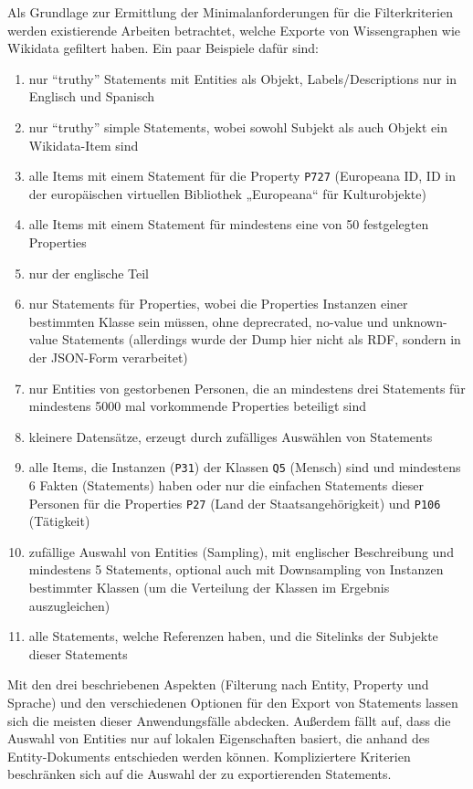 Als Grundlage zur Ermittlung der Minimalanforderungen für die Filterkriterien werden existierende Arbeiten betrachtet, welche Exporte von Wissengraphen wie Wikidata gefiltert haben.
Ein paar Beispiele dafür sind:
\begin{enumerate}[label=\arabic*)]
  \item nur "`truthy"' Statements mit Entities als Objekt, Labels/Descriptions nur in Englisch und Spanisch\cite{usage-grafa}
  \item nur "`truthy"' simple Statements, wobei sowohl Subjekt als auch Objekt ein Wikidata-Item sind\cite{usage-wembedder}
  \item alle Items mit einem Statement für die Property \verb|P727| (Europeana ID, ID in der europäischen virtuellen Bibliothek „Europeana“ für Kulturobjekte)\cite{usage-europeana}
  \item alle Items mit einem Statement für mindestens eine von 50 festgelegten Properties\cite{usage-narratives} 
  \item nur der englische Teil\cite{usage-web-tables} 
  \item nur Statements für Properties, wobei die Properties Instanzen einer bestimmten Klasse sein müssen, ohne deprecrated, no-value und unknown-value Statements\cite{usage-implicational-knowledge} (allerdings wurde der Dump hier nicht als RDF, sondern in der JSON-Form verarbeitet)
  \item nur Entities von gestorbenen Personen, die an mindestens drei Statements für mindestens 5000 mal vorkommende Properties beteiligt sind\cite{usage-learning-structured-embeddings}
  \item kleinere Datensätze, erzeugt durch zufälliges Auswählen von Statements\cite{usage-sparql-benchmark}
  \item alle Items, die Instanzen (\verb|P31|) der Klassen \verb|Q5| (Mensch) sind und mindestens 6 Fakten (Statements) haben\cite{usage-one-sentence} oder nur die einfachen Statements dieser Personen für die Properties \verb|P27| (Land der Staatsangehörigkeit) und \verb|P106| (Tätigkeit)\cite{usage-person-networks}
  \item zufällige Auswahl von Entities (Sampling), mit englischer Beschreibung und mindestens 5 Statements\cite{usage-generate-entity-type-desc}, optional auch mit Downsampling von Instanzen bestimmter Klassen (um die Verteilung der Klassen im Ergebnis auszugleichen)\cite{usage-synthesize-entity-desc}
  \item alle Statements, welche Referenzen haben, und die Sitelinks der Subjekte dieser Statements\cite{wd-wk-common-references}
\end{enumerate}
Mit den drei beschriebenen Aspekten (Filterung nach Entity, Property und Sprache) und den verschiedenen Optionen für den Export von Statements lassen sich die meisten dieser Anwendungsfälle abdecken.
Außerdem fällt auf, dass die Auswahl von Entities nur auf lokalen Eigenschaften basiert, die anhand des Entity-Dokuments entschieden werden können. 
Kompliziertere Kriterien beschränken sich auf die Auswahl der zu exportierenden Statements.

